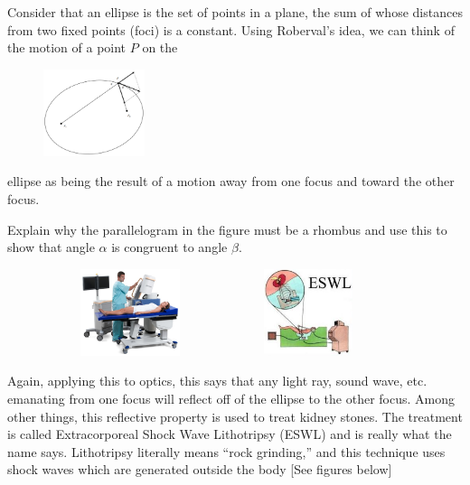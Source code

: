 \begin{embeddedproblem}{}
Consider that an ellipse is the set of points in a plane, the sum of
  whose distances from two fixed points (foci) is a constant.  Using
  Roberval's idea, we can think of the motion of a point $P$ on the\\
\centerline{\includegraphics*[height=1in,width=2in]{Figures/Ellipse}}
  ellipse as being the result of a motion away from one focus and
  toward the other focus.

  Explain why the parallelogram in the figure must be a rhombus and
  use this to show that angle $\alpha$ is congruent to angle $\beta.$
\end{embeddedproblem}

\begin{figure}
\captionsetup{labelformat=empty}
\centerline{\includegraphics*[height=1in,width=2in]{Figures/Kidney1} \includegraphics*[height=1in,width=2in]{Figures/Kidney2}}
\label{fig:}
\end{figure}
Again, applying this to optics, this says that any light ray, sound
wave, etc. emanating from one focus will reflect off of the ellipse to
the other focus.  Among other things, this reflective property is used
to treat kidney stones.  The treatment is called Extracorporeal Shock
Wave Lithotripsy (ESWL) and is really what the name says.  Lithotripsy
literally means ``rock grinding,'' and this technique uses shock waves
which are generated outside the body [See figures below]

